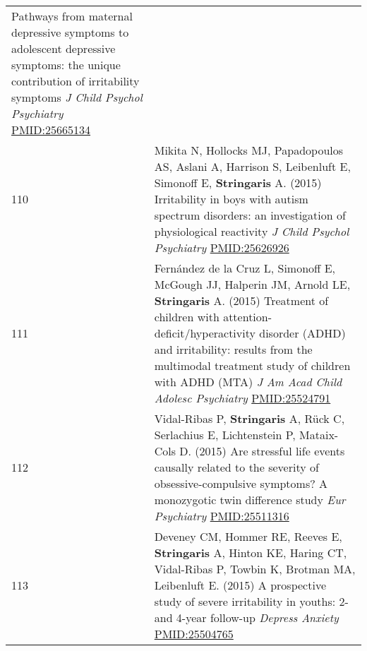 \documentclass[
]{article}
\begin{document}
\begin{longtable}[]{@{}ll@{}}
\begin{minipage}[t]{0.94\columnwidth}
Pathways from maternal depressive symptoms to adolescent depressive
symptoms: the unique contribution of irritability symptoms \emph{J Child
Psychol Psychiatry} \url{PMID:25665134}\strut
\end{minipage}\tabularnewline
\begin{minipage}[t]{0.01\columnwidth}\raggedright
110\strut
\end{minipage} & \begin{minipage}[t]{0.94\columnwidth}\raggedright
Mikita N, Hollocks MJ, Papadopoulos AS, Aslani A, Harrison S, Leibenluft
E, Simonoff E, \textbf{Stringaris} A. (2015) Irritability in boys with
autism spectrum disorders: an investigation of physiological reactivity
\emph{J Child Psychol Psychiatry} \url{PMID:25626926}\strut
\end{minipage}\tabularnewline
\begin{minipage}[t]{0.01\columnwidth}\raggedright
111\strut
\end{minipage} & \begin{minipage}[t]{0.94\columnwidth}\raggedright
Fernández de la Cruz L, Simonoff E, McGough JJ, Halperin JM, Arnold LE,
\textbf{Stringaris} A. (2015) Treatment of children with
attention-deficit/hyperactivity disorder (ADHD) and irritability:
results from the multimodal treatment study of children with ADHD (MTA)
\emph{J Am Acad Child Adolesc Psychiatry} \url{PMID:25524791}\strut
\end{minipage}\tabularnewline
\begin{minipage}[t]{0.01\columnwidth}\raggedright
112\strut
\end{minipage} & \begin{minipage}[t]{0.94\columnwidth}\raggedright
Vidal-Ribas P, \textbf{Stringaris} A, Rück C, Serlachius E, Lichtenstein
P, Mataix-Cols D. (2015) Are stressful life events causally related to
the severity of obsessive-compulsive symptoms? A monozygotic twin
difference study \emph{Eur Psychiatry} \url{PMID:25511316}\strut
\end{minipage}\tabularnewline
\begin{minipage}[t]{0.01\columnwidth}\raggedright
113\strut
\end{minipage} & \begin{minipage}[t]{0.94\columnwidth}\raggedright
Deveney CM, Hommer RE, Reeves E, \textbf{Stringaris} A, Hinton KE,
Haring CT, Vidal-Ribas P, Towbin K, Brotman MA, Leibenluft E. (2015) A
prospective study of severe irritability in youths: 2- and 4-year
follow-up \emph{Depress Anxiety} \url{PMID:25504765}\strut

\end{minipage}
\end{longtable}
\end{document}
